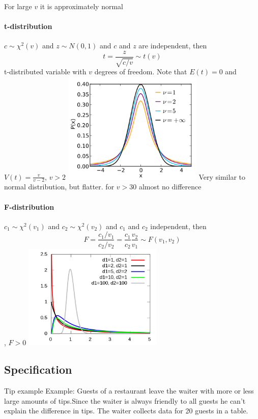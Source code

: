 \documentclass{article}
\begin{document}
For large $v$ it is approximately normal
\paragraph{t-distribution}
$c \sim \chi^2(v)$ and $z\sim N(0,1)$ and $c$ and $z$ are independent, then
$$t=\frac{z}{\sqrt{c/v}} \sim t(v)$$
t-distributed variable with $v$ degrees of freedom. Note that $E(t)=0$ and $V(t)=\frac{v}{v-2}$, $v>2$
\includegraphics[width=0.5\textwidth]{plots/360px-Student_t_pdf.png}
Very similar to normal distribution, but flatter. for $v>30$ almost no difference

\paragraph{F-distribution}
$c_1 \sim \chi^2(v_1)$ and $c_2 \sim \chi^2(v_2)$ and $c_1$ and $c_2$ independent, then
$$F=\frac{c_1/v_1}{c_2/v_2} = \frac{c_1}{c_2} \frac{v_2}{v_1} \sim F(v_1,v_2)$$, $F>0$
\includegraphics[width=0.5\textwidth]{plots/800px-F-distribution_pdf.png}

\subsection{Specification}

Tip example
Example:
Guests of a restaurant leave the waiter with more or less large amounts of tips.Since the waiter is always friendly to all guests he can't explain the difference in tips.  The waiter collects data for 20 guests in a table.
\end{document}
